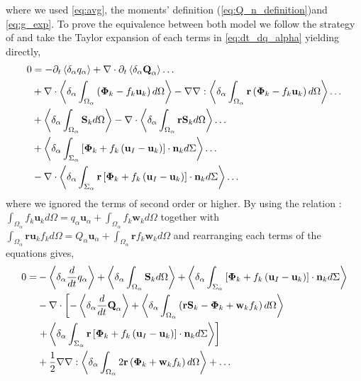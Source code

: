 where we used \ref{eq:avg}, the moments' definition (\ref{eq:Q_n_definition})and \ref{eq:g_exp}. 
To prove the equivalence between both model we follow the strategy of \citep{lhuillier2000bilan} and take the Taylor expansion of each terms in \ref{eq:dt_dq_alpha}  yielding directly, 
\begin{align}    
    0 &= 
    - \partial_t \left<\delta_\alpha q_\alpha\right> +  \mathbf{\nabla} \cdot  \partial_t\left<\delta_\alpha \textbf{Q}_\alpha\right> \ldots\nonumber\\
    &+ \mathbf{\nabla} \cdot \left<\delta_\alpha \int_{\Omega_\alpha}\left(\mathbf{\Phi}_k - f_k \textbf{u}_k \right)d\Omega\right>
    -\mathbf{\nabla}\mathbf{\nabla} : \left<\delta_\alpha \int_{\Omega_\alpha}\textbf{r}\left(\mathbf{\Phi}_k - f_k \textbf{u}_k \right)d\Omega\right>
    \ldots\nonumber\\
    &+ \left<\delta_\alpha  \int_{\Omega_\alpha} \textbf{S}_k d\Omega\right>
    - \mathbf{\nabla} \cdot \left<\delta_\alpha  \int_{\Omega_\alpha} \textbf{r}\textbf{S}_k d\Omega\right>
    \ldots\nonumber\\
    &+ \left<\delta_\alpha \int_{\Sigma_\alpha}\left[
        \mathbf{\Phi}_k
        + f_k
        \left(
            \textbf{u}_I
            - \textbf{u}_k
        \right)
    \right]
    \cdot \textbf{n}_kd\Sigma\right> \ldots\nonumber\\
    &-  \mathbf{\nabla} \cdot \left<\delta_\alpha \int_{\Sigma_\alpha} \textbf{r}\left[
        \mathbf{\Phi}_k
        + f_k
        \left(
            \textbf{u}_I
            - \textbf{u}_k
        \right)
    \right]
    \cdot \textbf{n}_kd\Sigma\right> \ldots
\end{align}
where we ignored the terms of second order or higher. 
By using the relation : $\int_{\Omega_\alpha} f_k \textbf{u}_k d\Omega = q_\alpha\textbf{u}_\alpha  + \int_{\Omega_\alpha} f_k \textbf{w}_k d\Omega$
together with $\int_{\Omega_\alpha} \textbf{r} \textbf{u}_k f_k d\Omega = Q_\alpha\textbf{u}_\alpha  + \int_{\Omega_\alpha}\textbf{r} f_k \textbf{w}_k d\Omega$ and  rearranging each terms of the equations gives,
\begin{align}    
    0 = 
    &- \left<\delta_\alpha \frac{d}{d t} q_\alpha\right>
    + \left<\delta_\alpha  \int_{\Omega_\alpha} \textbf{S}_k d\Omega\right>
    + \left<\delta_\alpha \int_{\Sigma_\alpha}\left[
        \mathbf{\Phi}_k
        + f_k
        \left(
            \textbf{u}_I
            - \textbf{u}_k
        \right)
    \right]
    \cdot \textbf{n}_kd\Sigma\right> \nonumber\\
    &-  \mathbf{\nabla} \cdot  \left[
        - \left<\delta_\alpha \frac{d}{d t} \textbf{Q}_\alpha\right> 
         + \left<\delta_\alpha  \int_{\Omega_\alpha} \left(
            \textbf{r}\textbf{S}_k - \mathbf{\Phi}_k + \textbf{w}_kf_k 
         \right)d\Omega\right>
    \right.
    \nonumber\\
    &\left. 
         + \left<\delta_\alpha \int_{\Sigma_\alpha} \textbf{r}\left[
        \mathbf{\Phi}_k
        + f_k
        \left(
            \textbf{u}_I
            - \textbf{u}_k
        \right)
        \right]
        \cdot \textbf{n}_kd\Sigma\right> 
    \right]\nonumber\\
    &+  \frac{1}{2}\mathbf{\nabla}\mathbf{\nabla} :
         \left<\delta_\alpha  \int_{\Omega_\alpha} 2\textbf{r}\left(\mathbf{\Phi}_k + \textbf{w}_kf_k 
         \right)d\Omega\right>
         + \ldots
    \label{eq:expansion_final}
\end{align}

